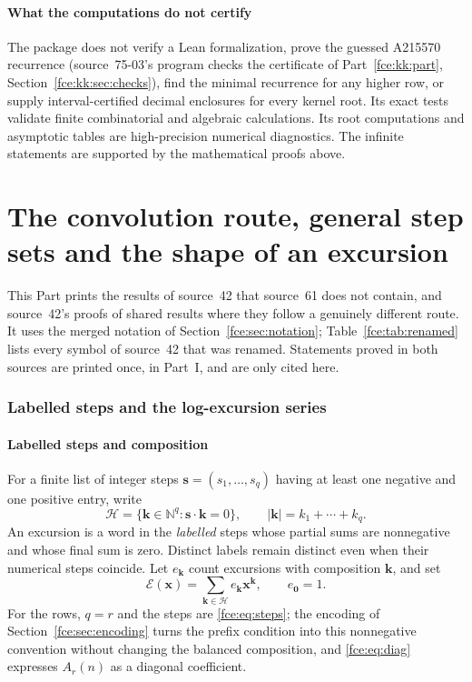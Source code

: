 \documentclass[11pt,a4paper]{article}
\numberwithin{equation}{section}
\theoremstyle{definition}\newtheorem{definition}[theorem]{Definition}
\theoremstyle{remark}\newtheorem{remark}[theorem]{Remark}
\newcommand{\N}{\mathbb N}
\newcommand{\E}{\mathcal E}
\begin{document}
\subsection{What the computations do not certify}
The package does not verify a Lean formalization, prove the guessed
A215570 recurrence (source~75-03's program checks the certificate of
Part~\ref{fce:kk:part}, Section~\ref{fce:kk:sec:checks}), find the minimal
recurrence for any higher row, or
supply interval-certified decimal enclosures for every kernel root.
Its exact tests validate finite combinatorial and algebraic calculations.
Its root computations and asymptotic tables are high-precision numerical
diagnostics. The infinite statements are supported by the mathematical
proofs above.

\part{The convolution route, general step sets and the shape of an excursion}\label{fce:lg:part}

This Part prints the results of source~42 that source~61 does not
contain, and source~42's proofs of shared results where they follow a
genuinely different route. It uses the merged notation of
Section~\ref{fce:sec:notation}; Table~\ref{fce:tab:renamed} lists every
symbol of source~42 that was renamed. Statements proved in both sources
are printed once, in Part~I, and are only cited here.

\section{Labelled steps and the log-excursion series}\label{fce:lg:sec:labelled}
\subsection{Labelled steps and composition}
For a finite list of integer steps $\boldsymbol s=(s_1,\ldots,s_q)$ having
at least one negative and one positive entry, write
\[
 \mathcal H=\{\boldsymbol k\in\N^q:\boldsymbol s\cdot\boldsymbol k=0\},\qquad
 |\boldsymbol k|=k_1+\cdots+k_q.
\]
An excursion is a word in the \emph{labelled} steps whose partial sums are
nonnegative and whose final sum is zero. Distinct labels remain distinct
even when their numerical steps coincide. Let $e_{\boldsymbol k}$ count
excursions with composition $\boldsymbol k$, and set
\begin{equation}\label{fce:lg:eq:Egf}
 \E(\boldsymbol x)=\sum_{\boldsymbol k\in\mathcal H}e_{\boldsymbol k}
 \boldsymbol x^{\boldsymbol k},\qquad e_{\boldsymbol0}=1.
\end{equation}
For the rows, $q=r$ and the steps are \eqref{fce:eq:steps}; the encoding
of Section~\ref{fce:sec:encoding} turns the prefix condition into this
nonnegative convention without changing the balanced composition, and
\eqref{fce:eq:diag} expresses $A_r(n)$ as a diagonal coefficient.
\end{document}
